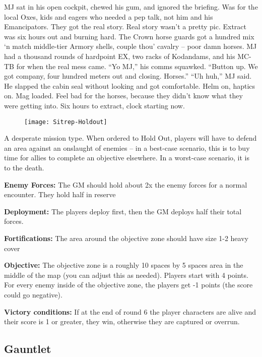 MJ sat in his open cockpit, chewed his gum, and ignored the briefing. Was for the local Oxes, kids and eagers who needed a pep talk, not him and his Emancipators. They got the real story. Real story wasn’t a pretty pic. Extract was six hours out and burning hard. The Crown horse guards got a hundred mix ‘n match middle-tier Armory shells, couple thou’ cavalry -- poor damn horses. MJ had a thousand rounds of hardpoint EX, two racks of Kodandams, and his MC-TB for when the real mess came. “Yo MJ,” his comms squawked. “Button up. We got company, four hundred meters out and closing. Horses.” “Uh huh,” MJ said. He slapped the cabin seal without looking and got comfortable. Helm on, haptics on. Mag loaded. Feel bad for the horses, because they didn’t know what they were getting into. Six hours to extract, clock starting now.

 \begin{figure}\begin{center}
   \texttt{[image: Sitrep-Holdout]}
 \end{center}\end{figure}

 A desperate mission type. When ordered to Hold Out, players will have to defend an area against an onslaught of enemies -- in a best-case scenario, this is to buy time for allies to complete an objective elsewhere. In a worst-case scenario, it is to the death.

 \textbf{Enemy Forces:} The GM should hold about 2x the enemy forces for a normal encounter. They hold half in reserve

 \textbf{Deployment:} The players deploy first, then the GM deploys half their total forces.

 \textbf{Fortifications:} The area around the objective zone should have size 1-2 heavy cover

 \textbf{Objective:} The objective zone is a roughly 10 spaces by 5 spaces area in the middle of the map (you can adjust this as needed). Players start with 4 points. For every enemy inside of the objective zone, the players get -1 points (the score could go negative).

 \textbf{Victory conditions:}  If at the end of round 6 the player characters are alive and their score is 1 or greater, they win, otherwise they are captured or overrun.


 \newpage
 \subsection{Gauntlet}

